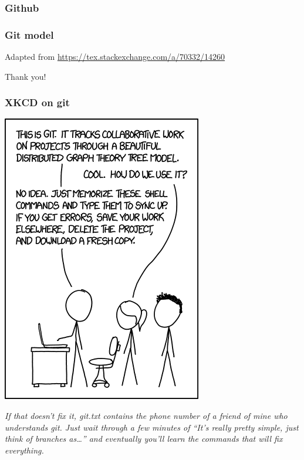 \documentclass[10pt,svgnames]{beamer}
\begin{document}

\begin{frame}
\frametitle{Github}
\end{frame}

\begin{frame}
\frametitle{Git model}

Adapted from \href{https://tex.stackexchange.com/a/70332/14260}{https://tex.stackexchange.com/a/70332/14260}
\end{frame}

\begin{frame}[standout]
Thank you!
\end{frame}

\appendix

\begin{frame}
\label{xkcd_git}
\frametitle{XKCD on git \hfill\hyperlink{git_cons}{}}

\begin{center}
\includegraphics[height=0.5\paperheight]{figures/xkcd-git.png}
\end{center}

\emph{If that doesn't fix it, git.txt contains the phone number of a friend of mine who understands git.
Just wait through a few minutes of “It's really pretty simple, just think of branches as\ldots” and eventually you'll learn the commands that will fix everything.
}

\end{frame}
\end{document}
